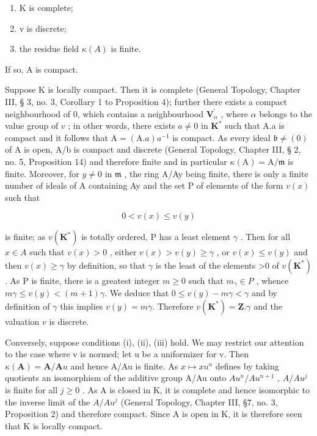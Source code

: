 \begin{enumerate}
\def\labelenumi{(\roman{enumi})}
\item
  K is complete;
\item
  v is discrete;
\item
  the residue field \(\kappa(A)\) is finite.
\end{enumerate}

If so, A is compact.

Suppose K is locally compact. Then it is complete (General Topology, Chapter III, § 3, no. 3, Corollary 1 to Proposition 4); further there exists a compact neighbourhood of 0, which contains a neighbourhood \(\mathbf{V}_{\alpha}^{\prime}\) , where \(\alpha\) belongs to the value group of \(v\) ; in other words, there exists \(a \neq 0\) in \(\mathbf{K}^*\) such that A.a is compact and it follows that \(\mathrm{A} = (\mathrm{A}.a)a^{-1}\) is compact. As every ideal \(\mathfrak{b} \neq (0)\) of A is open, A/b is compact and discrete (General Topology, Chapter III, § 2, no. 5, Proposition 14) and therefore finite and in particular \(\kappa(\mathrm{A}) = \mathrm{A}/\mathfrak{m}\) is finite. Moreover, for \(y \neq 0\) in \(\mathfrak{m}\) , the ring A/Ay being finite, there is only a finite number of ideals of A containing Ay and the set P of elements of the form \(v(x)\) such that

\[
0 <   v (x) \leqslant v (y)
\]

is finite; as \(v(\mathbf{K}^{*})\) is totally ordered, P has a least element \(\gamma\) . Then for all \(x \in A\) such that \(v(x) > 0\) , either \(v(x) > v(y) \geqslant \gamma\) , or \(v(x) \leqslant v(y)\) and then \(v(x) \geqslant \gamma\) by definition, so that \(\gamma\) is the least of the elements >0 of \(v(\mathbf{K}^{*})\) . As P is finite, there is a greatest integer \(m \geqslant 0\) such that \(m_{\gamma} \in P\) , whence \(m\gamma \leqslant v(y) < (m + 1)\gamma.\) We deduce that \(0 \leqslant v(y) - m\gamma < \gamma\) and by definition of \(\gamma\) this implies \(v(y) = m\gamma.\) Therefore \(v(\mathbf{K}^{*}) = \mathbf{Z}. \gamma\) and the valuation \(v\) is discrete.

Conversely, suppose conditions (i), (ii), (iii) hold. We may restrict our attention to the case where v is normed; let u be a uniformizer for v. Then \(\kappa(\mathbf{A}) = \mathbf{A}/\mathbf{A}u\) and hence A/Au is finite. As \(x \mapsto xu^{n}\) defines by taking quotients an isomorphism of the additive group A/Au onto \(Au^{n}/Au^{n+1}\) , \(A/Au^{j}\) is finite for all \(j \geqslant 0\) . As A is closed in K, it is complete and hence isomorphic to the inverse limit of the \(A/Au^{j}\) (General Topology, Chapter III, §7, no. 3, Proposition 2) and therefore compact. Since A is open in K, it is therefore seen that K is locally compact.

